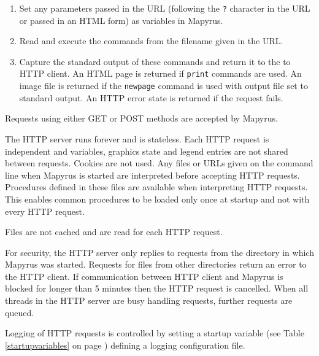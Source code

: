 \begin{enumerate}
\item
Set any parameters passed in the URL (following the \texttt{?} character in
the URL or passed in an HTML form) as variables in Mapyrus.
\item
Read and execute the commands from the filename given in the URL.
\item
Capture the standard output of these commands and return it to the
to HTTP client.  An HTML page is returned if
\texttt{print} commands are used.  An image file is
returned if the
\texttt{newpage} command is used with output file set
to standard output.
An HTTP error state is returned if the request fails.
\end{enumerate}

Requests using either GET or POST methods are accepted by Mapyrus.

The HTTP server runs forever and
is stateless.  Each HTTP request is independent and
variables, graphics state and legend entries are not shared between
requests.  Cookies are not used.
Any files or URLs given on the command line when Mapyrus is started
are interpreted before accepting HTTP requests.
Procedures defined in these files
are available when interpreting HTTP requests.  This enables
common procedures to be loaded only once at startup and not with every
HTTP request.

Files are not cached and are read for each HTTP request.

For security, the HTTP server only replies to requests
from the directory in which Mapyrus was started.
Requests for files from other directories return an error to the HTTP client.
If communication between HTTP client and Mapyrus is blocked for longer than
5 minutes then the HTTP request is cancelled.
When all threads in the HTTP server are busy handling requests,
further requests are queued.

Logging of HTTP requests is controlled by setting a startup variable (see Table
\ref{startupvariables} on page \pageref{startupvariables}) defining a logging
configuration file.

